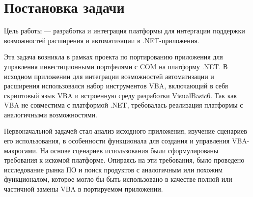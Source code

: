 \section{Постановка задачи}

Цель работы --- разработка и интеграция платформы для интергации поддержки возможностей расширения и автоматизации в .NET-приложения.

Эта задача возникла в рамках проекта по портированию приложения для управления инвестиционными портфелями с COM на платформу .NET. В исходном приложении для интеграции возможностей автоматизации и расширения использовался набор инструментов VBA, включающий в себя скриптовый язык VBA и встроенную среду разработки VisualBasic6. Так как VBA не совместима с платформой .NET, требовалась реализация платформы с аналогичными возможностями. 

Первоначальной задачей стал анализ исходного приложения, изучение сценариев его использования, в особенности функционала для создания и управления VBA-макросами. На основе сценариев использования были сформулированы требования к искомой платформе. Опираясь на эти требования, было проведено исследование рынка ПО и поиск продуктов с аналогичным или похожим функционалом, которое могло бы быть использовано в качестве полной или частичной замены VBA в портируемом приложении.



\pagebreak